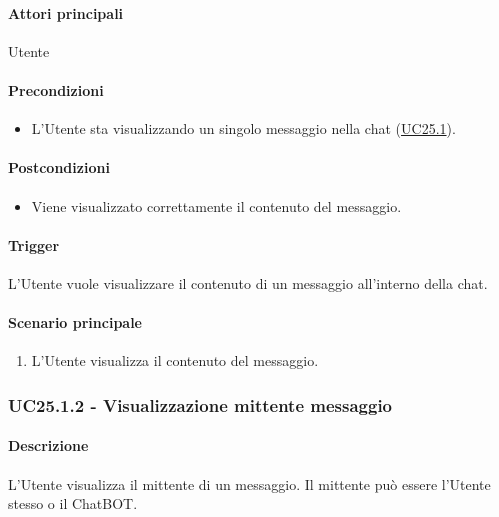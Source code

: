 \paragraph*{Attori principali}
Utente

\paragraph*{Precondizioni}
\begin{itemize}
  \item L'Utente sta visualizzando un singolo messaggio nella chat (\hyperref[UC25point1]{UC25.1}).
\end{itemize}

\paragraph*{Postcondizioni}
\begin{itemize}
  \item Viene visualizzato correttamente il contenuto del messaggio.
\end{itemize}

\paragraph*{Trigger}
L'Utente vuole visualizzare il contenuto di un messaggio all'interno della chat.

\paragraph*{Scenario principale}
\begin{enumerate}
  \item L'Utente visualizza il contenuto del messaggio.
\end{enumerate}


\subsubsection{UC25.1.2 - Visualizzazione mittente messaggio}\label{UC25point1point2}
\paragraph*{Descrizione}
L'Utente visualizza il mittente di un messaggio. Il mittente può essere l'Utente stesso o il ChatBOT.

